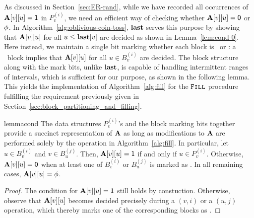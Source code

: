As discussed in Section~\ref{sec:ER-rand}, while we have recorded all occurrences of $\mathbf{A}[v][u]=\mathsf{1}$ in $P_v^{(i)}$,
we need an efficient way of checking whether $\mathbf{A}[v][u] = \mathsf{0}$ or $\phi$. In Algorithm~\ref{alg:oblivious-coin-toss},
$\mathbf{last}$ serves this purpose by showing that $\mathbf{A}[v][u]$ for all $u \leq \mathbf{last}[v]$ are decided as shown in Lemma~\ref{lem:cond-0}.
Here instead, we maintain a single bit marking whether each block is \filled~or \unfilled:
a \filled~block implies that $\mathbf{A}[v][u]$ for all $u \in B^{(i)}_v$ are decided.
The block structure along with the mark bits, unlike $\mathbf{last}$, is capable of handling intermittent ranges of intervals,
which is sufficient for our purpose, as shown in the following lemma.
This yields the implementation of Algorithm~\ref{alg:fill} for the $\texttt{\textsc{Fill}}$ procedure
fulfilling the requirement previously given in Section~\ref{sec:block_partitioning_and_filling}.

\begin{restatable}{lemma}{cond}\label{lem:cond-0-fill}
The data structures $P_v^{(i)}$'s and the block marking bits together provide a succinct representation of $\mathbf{A}$ as long as modifications to $\mathbf{A}$ are performed solely by the  operation in Algorithm~\ref{alg:fill}. In particular, let $u \in B^{(i)}_v$ and $v \in B_u^{(j)}$. Then, $\mathbf{A}[v][u]=\mathsf{1}$ if and only if $u \in P_v^{(i)}$. Otherwise, $\mathbf{A}[v][u]=\mathsf{0}$ when at least one of $B^{(i)}_v$ or $B_u^{(j)}$ is marked as \filled. In all remaining cases, $\mathbf{A}[v][u]=\phi$.
\end{restatable}
\begin{proof}
The condition for $\mathbf{A}[v][u]=\mathsf{1}$ still holds by constuction. Otherwise, observe that $\mathbf{A}[v][u]$ becomes decided precisely during a $(v,i)$ or a $(u,j)$ operation, which thereby marks one of the corresponding blocks as \filled.
\end{proof}


